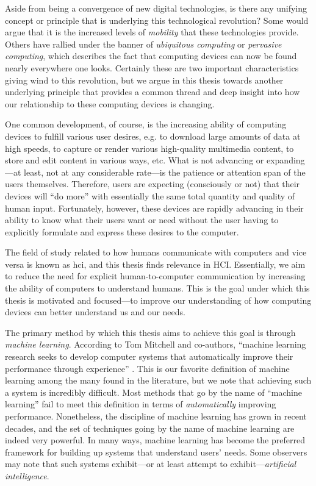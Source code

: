 Aside from being a convergence of new digital technologies, is there any unifying concept or principle that is underlying this technological revolution? Some would argue that it is the increased levels of \emph{mobility} that these technologies provide. Others have rallied under the banner of \emph{ubiquitous computing} or \emph{pervasive computing}, which describes the fact that computing devices can now be found nearly everywhere one looks. Certainly these are two important characteristics giving wind to this revolution, but we argue in this thesis towards another underlying principle that provides a common thread and deep insight into how our relationship to these computing devices is changing.

One common development, of course, is the increasing ability of computing devices to fulfill various user desires, e.g. to download large amounts of data at high speeds, to capture or render various high-quality multimedia content, to store and edit content in various ways, etc. What is not advancing or expanding---at least, not at any considerable rate---is the patience or attention span of the users themselves. Therefore, users are expecting (consciously or not) that their devices will ``do more'' with essentially the same total quantity and quality of human input. Fortunately, however, these devices are rapidly advancing in their ability to know what their users want or need without the user having to explicitly formulate and express these desires to the computer.

The field of study related to how humans communicate with computers and vice versa is known as \gls{hci}, and this thesis finds relevance in HCI. Essentially, we aim to reduce the need for explicit human-to-computer communication by increasing the ability of computers to understand humans. This is the goal under which this thesis is motivated and focused---to improve our understanding of how computing devices can better understand us and our needs.

The primary method by which this thesis aims to achieve this goal is through \emph{machine learning}. According to Tom Mitchell and co-authors, ``machine learning research seeks to develop computer systems that automatically improve their performance through experience'' \cite{Mitchell1990}. This is our favorite definition of machine learning among the many found in the literature, but we note that achieving such a system is incredibly difficult. Most methods that go by the name of ``machine learning'' fail to meet this definition in terms of \emph{automatically} improving performance. Nonetheless, the discipline of machine learning has grown in recent decades, and the set of techniques going by the name of machine learning are indeed very powerful. In many ways, machine learning has become the preferred framework for building up systems that understand users' needs. Some observers may note that such systems exhibit---or at least attempt to exhibit---\emph{artificial intelligence}.

